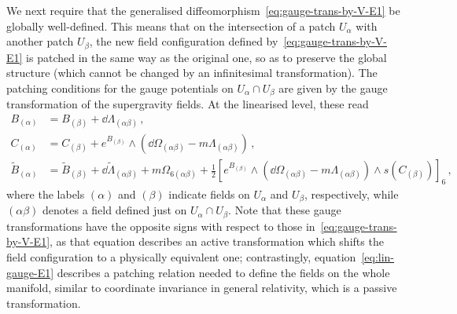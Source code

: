 \documentclass[debug]{phd}
\begin{document}
				We next require that the generalised diffeomorphism~\eqref{eq:gauge-trans-by-V-E1} be globally well-defined. 
				This means that on the intersection of a patch $U_\alpha$ with another patch $U_\beta$, the new field configuration defined by~\eqref{eq:gauge-trans-by-V-E1} is patched in the same way as the original one, so as to preserve the global structure (which cannot be changed by an infinitesimal transformation). 
				The patching conditions for the gauge potentials on $U_{\alpha} \cap U_{\beta}$ are given by the gauge transformation of the supergravity fields. 
				At the linearised level, these read
						\begin{equation}\label{eq:lin-gauge-E1}
							\begin{split}
								B_{(\alpha)} &= B_{(\beta)} + \dd \Lambda_{(\alpha\beta)} \, ,\\
								C_{(\alpha)} &= C_{(\beta)} + e^{B_{(\beta)} } \wedge (\dd \Omega_{(\alpha\beta)} -m \Lambda_{(\alpha\beta)})\, , \\
								\tilde{B}_{(\alpha)} &= \tilde{B}_{(\beta)} + \dd \tilde \Lambda_{(\alpha\beta)} + m \Omega_{6(\alpha\beta)} + \tfrac{1}{2} \left[e^{B_{(\beta)}}\wedge (\dd \Omega_{(\alpha\beta)} -m\Lambda_{(\alpha\beta)})\wedge s(C_{(\beta)}) \right]_6 \, ,
							\end{split}
						\end{equation}
				where the labels $(\alpha)$ and $(\beta)$ indicate fields on $U_\alpha$ and $U_\beta$, respectively, while $(\alpha\beta)$ denotes a field defined just on $U_{\alpha} \cap U_{\beta}$. 
				Note that these gauge transformations have the opposite signs with respect to those in~\eqref{eq:gauge-trans-by-V-E1}, as that equation describes an active transformation which shifts the field configuration to a physically equivalent one; contrastingly, equation~\eqref{eq:lin-gauge-E1} describes a patching relation needed to define the fields on the whole manifold, similar to coordinate invariance in general relativity, which is a passive transformation.
\end{document}
